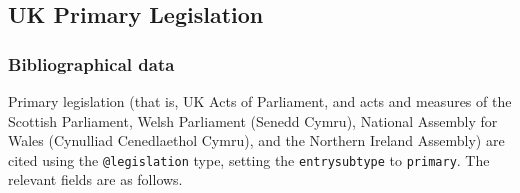 \documentclass[a4paper,
               11pt,
	       DIV=1,			   
	       footinclude=false]
	      {scrartcl}
\begin{document}
\subsection{UK Primary Legislation}

\subsubsection{Bibliographical data}
Primary legislation (that is, UK Acts of Parliament, and acts and
measures of the Scottish Parliament, Welsh Parliament (Senedd Cymru),
National Assembly for Wales (Cynulliad Cenedlaethol Cymru), and the
Northern Ireland Assembly) are cited using the \texttt{@legislation}
type, setting the \texttt{entrysubtype} to \texttt{primary}. The
relevant fields are as follows.
\end{document}
